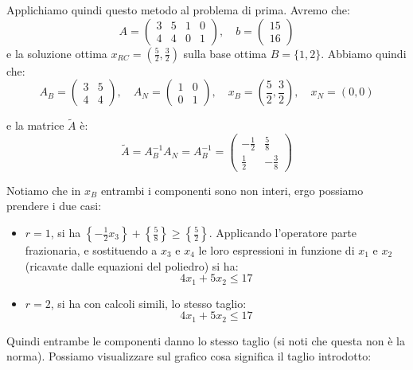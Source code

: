 \documentclass[a4paper,11pt]{article}
\begin{document}
Applichiamo quindi questo metodo al problema di prima.
Avremo che:
$$
A= \begin{pmatrix}
	3 & 5 & 1 & 0 \\ 4 & 4 & 0 & 1
\end{pmatrix}, \quad 
b= \begin{pmatrix}
15 \\ 16
\end{pmatrix}
$$
e la soluzione ottima $x_{RC} = \left( \frac{5}{2}, \frac{3}{2} \right)$ sulla base ottima $B = \{1,2\}$.
Abbiamo quindi che:
$$
A_B = \begin{pmatrix}
	3 & 5 \\ 4 & 4 
\end{pmatrix}, \quad 
A_N = \begin{pmatrix}
	1 & 0 \\ 0 & 1
\end{pmatrix}, \quad 
x_B = \left( \frac{5}{2}, \frac{3}{2} \right), \quad 
x_N = ( 0, 0 )
$$

e la matrice $\tilde{A}$ è:
$$
\tilde{A} = A_B^{-1} A_N = A_B^{-1} = \begin{pmatrix}
	-\frac{1}{2} & \frac{5}{8} \\ \frac{1}{2} & -\frac{3}{8}
\end{pmatrix} 
$$

Notiamo che in $x_B$ entrambi i componenti sono non interi, ergo possiamo prendere i due casi:
\begin{itemize}
	\item $r=1$, si ha $\left\{ -\frac{1}{2} x_3 \right\} + \left\{ \frac{5}{8} \right\} \geq \left\{ \frac{5}{2} \right\}$. Applicando l'operatore parte frazionaria, e sostituendo a $x_3$ e $x_4$ le loro espressioni in funzione di $x_1$ e $x_2$ (ricavate dalle equazioni del poliedro) si ha:
		$$ 4x_1 + 5x_2 \leq 17 $$
	\item $r=2$, si ha con calcoli simili, lo stesso taglio:
		$$ 4x_1 + 5x_2 \leq 17 $$
\end{itemize}

Quindi entrambe le componenti danno lo stesso taglio (si noti che questa non è la norma).
Possiamo visualizzare sul grafico cosa significa il taglio introdotto:
\end{document}
